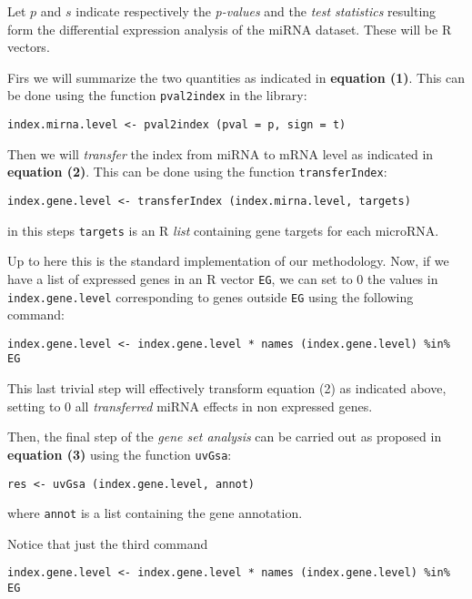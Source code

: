 \documentclass[]{article}
\begin{document}
Let \(p\) and \(s\) indicate respectively the \emph{p-values} and the
\emph{test statistics} resulting form the differential expression
analysis of the miRNA dataset. These will be R vectors.

Firs we will summarize the two quantities as indicated in
\textbf{equation (1)}. This can be done using the function
\texttt{pval2index} in the library:

\begin{verbatim}
index.mirna.level <- pval2index (pval = p, sign = t)
\end{verbatim}

Then we will \emph{transfer} the index from miRNA to mRNA level as
indicated in \textbf{equation (2)}. This can be done using the function
\texttt{transferIndex}:

\begin{verbatim}
index.gene.level <- transferIndex (index.mirna.level, targets)
\end{verbatim}

in this steps \texttt{targets} is an R \emph{list} containing gene
targets for each microRNA.

Up to here this is the standard implementation of our methodology. Now,
if we have a list of expressed genes in an R vector \texttt{EG}, we can
set to 0 the values in \texttt{index.gene.level} corresponding to genes
outside \texttt{EG} using the following command:

\begin{verbatim}
index.gene.level <- index.gene.level * names (index.gene.level) %in% EG
\end{verbatim}

This last trivial step will effectively transform equation (2) as
indicated above, setting to 0 all \emph{transferred} miRNA effects in
non expressed genes.

Then, the final step of the \emph{gene set analysis} can be carried out
as proposed in \textbf{equation (3)} using the function \texttt{uvGsa}:

\begin{verbatim}
res <- uvGsa (index.gene.level, annot)
\end{verbatim}

where \texttt{annot} is a list containing the gene annotation.

\bigskip

Notice that just the third command

\begin{verbatim}
index.gene.level <- index.gene.level * names (index.gene.level) %in% EG
\end{verbatim}
\end{document}
